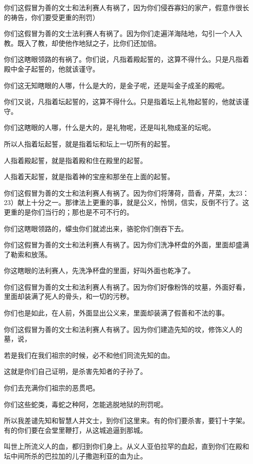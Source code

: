 \documentclass[12pt,oneside]{book}
\begin{document}
你们这假冒为善的文士和法利赛人有祸了，因为你们侵吞寡妇的家产，假意作很长的祷告，你们要受更重的刑罚）

你们这假冒为善的文士法利赛人有祸了。因为你们走遍洋海陆地，勾引一个人入教。既入了教，却使他作地狱之子，比你们还加倍。

你们这瞎眼领路的有祸了。你们说，凡指着殿起誓的，这算不得什么。只是凡指着殿中金子起誓的，他就该谨守。

你们这无知瞎眼的人哪，什么是大的，是金子呢，还是叫金子成圣的殿呢。

你们又说，凡指着坛起誓的，这算不得什么。只是指着坛上礼物起誓的，他就该谨守。

你们这瞎眼的人哪，什么是大的，是礼物呢，还是叫礼物成圣的坛呢。

所以人指着坛起誓，就是指着坛和坛上一切所有的起誓。

人指着殿起誓，就是指着殿和住在殿里的起誓。

人指着天起誓，就是指着神的宝座和那坐在上面的起誓。

你们这假冒为善的文士和法利赛人有祸了。因为你们将薄荷，茴香，芹菜，太23：23）献上十分之一。那律法上更重的事，就是公义，怜悯，信实，反倒不行了。这更重的是你们当行的；那也是不可不行的。

你们这瞎眼领路的，蠓虫你们就滤出来，骆驼你们倒吞下去。

你们这假冒为善的文士和法利赛人有祸了。因为你们洗净杯盘的外面，里面却盛满了勒索和放荡。

你这瞎眼的法利赛人，先洗净杯盘的里面，好叫外面也乾净了。

你们这假冒为善的文士和法利赛人有祸了。因为你们好像粉饰的坟墓，外面好看，里面却装满了死人的骨头，和一切的污秽。

你们也是如此，在人前，外面显出公义来，里面却装满了假善和不法的事。

你们这假冒为善的文士和法利赛人有祸了。因为你们建造先知的坟，修饰义人的墓，说，

若是我们在我们祖宗的时候，必不和他们同流先知的血。

这就是你们自己证明，是杀害先知者的子孙了。

你们去充满你们祖宗的恶贯吧。

你们这些蛇类，毒蛇之种阿，怎能逃脱地狱的刑罚呢。

所以我差谴先知和智慧人并文士，到你们这里来。有的你们要杀害，要钉十字架。有的你们要在会堂里鞭打，从这城追逼到那城。

叫世上所流义人的血，都归到你们身上。从义人亚伯拉罕的血起，直到你们在殿和坛中间所杀的巴拉加的儿子撒迦利亚的血为止。
\end{document}
